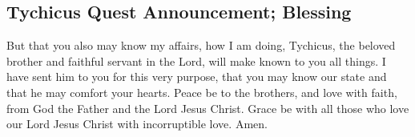 \hypertarget{tychicus-quest-announcement-blessing}{%
\subsection{Tychicus Quest Announcement;
Blessing}\label{tychicus-quest-announcement-blessing}}

 But that you also may know my affairs, how I am doing,
Tychicus, the beloved brother and faithful servant in the Lord, will
make known to you all things.  I have sent him to you for
this very purpose, that you may know our state and that he may comfort
your hearts.  Peace be to the brothers, and love with
faith, from God the Father and the Lord Jesus Christ. 
Grace be with all those who love our Lord Jesus Christ with
incorruptible love. Amen.
